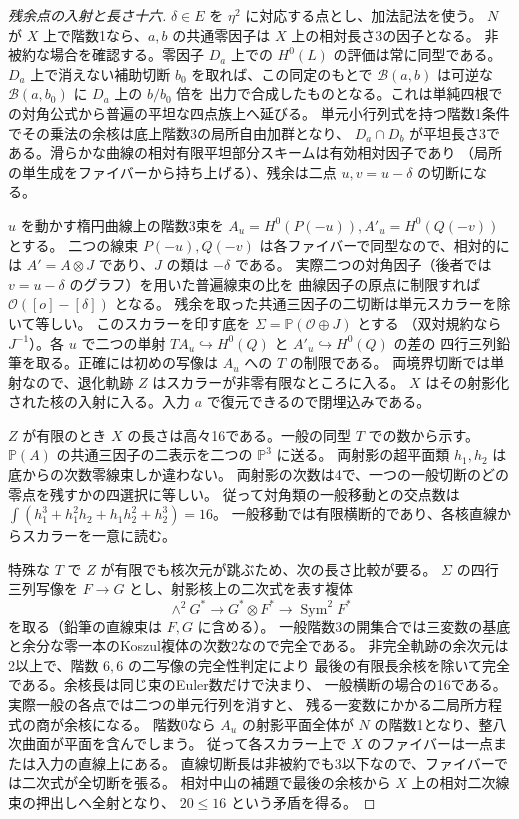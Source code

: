 \begin{proof}[残余点の入射と長さ十六]
$\delta\in E$ を $\eta^2$ に対応する点とし、加法記法を使う。
$N$ が $X$ 上で階数1なら、$a,b$ の共通零因子は $X$ 上の相対長さ3の因子となる。
非被約な場合を確認する。零因子 $D_a$ 上での $H^0(L)$ の評価は常に同型である。
$D_a$ 上で消えない補助切断 $b_0$ を取れば、この同定のもとで
$\mathcal B(a,b)$ は可逆な $\mathcal B(a,b_0)$ に $D_a$ 上の $b/b_0$ 倍を
出力で合成したものとなる。これは単純四根での対角公式から普遍の平坦な四点族上へ延びる。
単元小行列式を持つ階数1条件でその乗法の余核は底上階数3の局所自由加群となり、
$D_a\cap D_b$ が平坦長さ3である。滑らかな曲線の相対有限平坦部分スキームは有効相対因子であり
（局所の単生成をファイバーから持ち上げる）、残余は二点 $u,v=u-\delta$ の切断になる。

$u$ を動かす楕円曲線上の階数3束を
$A_u=H^0(P(-u)), A'_u=H^0(Q(-v))$ とする。
二つの線束 $P(-u),Q(-v)$ は各ファイバーで同型なので、相対的には
$A'=A\otimes J$ であり、$J$ の類は $-\delta$ である。
実際二つの対角因子（後者では $v=u-\delta$ のグラフ）を用いた普遍線束の比を
曲線因子の原点に制限すれば $\mathcal O([o]-[\delta])$ となる。
残余を取った共通三因子の二切断は単元スカラーを除いて等しい。
このスカラーを印す底を $\Sigma=\mathbb P(\mathcal O\oplus J)$ とする
（双対規約なら $J^{-1}$）。各 $u$ で二つの単射
$TA_u\hookrightarrow H^0(Q)$ と $A'_u\hookrightarrow H^0(Q)$ の差の
四行三列鉛筆を取る。正確には初めの写像は $A_u$ への $T$ の制限である。
両境界切断では単射なので、退化軌跡 $Z$ はスカラーが非零有限なところに入る。
$X$ はその射影化された核の入射に入る。入力 $a$ で復元できるので閉埋込みである。

$Z$ が有限のとき $X$ の長さは高々16である。一般の同型 $T$ での数から示す。
$\mathbb P(A)$ の共通三因子の二表示を二つの $\mathbb P^3$ に送る。
両射影の超平面類 $h_1,h_2$ は底からの次数零線束しか違わない。
両射影の次数は4で、一つの一般切断のどの零点を残すかの四選択に等しい。
従って対角類の一般移動との交点数は
$\int(h_1^3+h_1^2h_2+h_1h_2^2+h_2^3)=16$。
一般移動では有限横断的であり、各核直線からスカラーを一意に読む。

特殊な $T$ で $Z$ が有限でも核次元が跳ぶため、次の長さ比較が要る。
$\Sigma$ の四行三列写像を $F\to G$ とし、射影核上の二次式を表す複体
\[
 \wedge^2G^*\longrightarrow G^*\otimes F^*
     \longrightarrow\operatorname{Sym}^2 F^*
\]
を取る（鉛筆の直線束は $F,G$ に含める）。
一般階数3の開集合では三変数の基底と余分な零一本のKoszul複体の次数2なので完全である。
非完全軌跡の余次元は2以上で、階数 $6,6$ の二写像の完全性判定により
最後の有限長余核を除いて完全である。余核長は同じ束のEuler数だけで決まり、
一般横断の場合の16である。実際一般の各点では二つの単元行列を消すと、
残る一変数にかかる二局所方程式の商が余核になる。
階数0なら $A_u$ の射影平面全体が $N$ の階数1となり、整八次曲面が平面を含んでしまう。
従って各スカラー上で $X$ のファイバーは一点または入力の直線上にある。
直線切断長は非被約でも3以下なので、ファイバーでは二次式が全切断を張る。
相対中山の補題で最後の余核から $X$ 上の相対二次線束の押出しへ全射となり、
$20\le16$ という矛盾を得る。
\end{proof}

